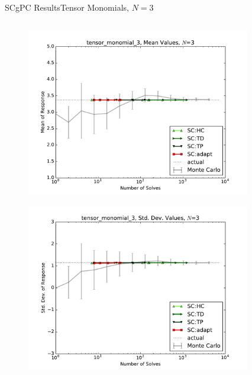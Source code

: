 \documentclass{beamer}
\begin{document}
\begin{frame}{SCgPC Results}{Tensor Monomials, $N=3$}\vspace{-20pt}
 \begin{columns}
   \begin{column}{0.5\textwidth}
        \begin{figure}[h!]
          \centering
          \includegraphics[width=0.8\linewidth]{anlmodels/tensor_monomial_3_mean_vals_nohdmr}
        \end{figure}
        \vspace{-20pt}
        \begin{figure}[h!]
          \centering
          \includegraphics[width=0.8\linewidth]{anlmodels/tensor_monomial_3_var_vals_nohdmr}
        \end{figure}
   \end{column}
   \begin{column}{0.5\textwidth}
        \begin{figure}[h!]
          \centering

\end{figure}
\end{column}
\end{columns}
\end{frame}
\end{document}
